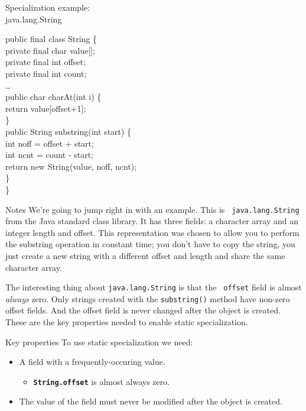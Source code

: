 \documentclass[%
pdf,
colorBG,
slideColor,
nototal,
oqe
]{prosper}
\newenvironment{talknotes}{\begin{slide}{Notes}\tiny}{\end{slide}}
\begin{document}
\begin{slide}{Specialization example:\\\small java.lang.String}
\fontsize{9}{9}%
\bfseries\begin{samplecode}%
public final class String \{\\
\>private final char value[];\\
\>private final int offset;\\
\>private final int count;\\
\>\ldots\\
\>public char charAt(int i) \{\\
\>\>return value[offset+1];\\
\>\}\\
\>public String substring(int start) \{\\
\>\>int noff = offset + start;\\
\>\>int ncnt = count - start;\\
\>\>return new String(value, noff, ncnt);\\
\>\}\\
\}\\
\end{samplecode}
\end{slide}

\begin{talknotes}
We're going to jump right in with an example.  This is {\tt
  java.lang.String} from the Java standard class library.  It has
three fields: a character array and an integer length and offset.
This representation was chosen to allow you to perform the substring
operation in constant time; you don't have to copy the string, you
just create a new string with a different offset and length and
share the same character array.

The interesting thing about {\tt java.lang.String} is that the {\tt
  offset} field is almost \emph{always} zero.  Only strings created
with the {\tt substring()} method have non-zero offset fields. 
And the offset field is never changed after the object is created.
These are the key properties needed to enable static specialization.
\end{talknotes}

\begin{slide}{Key properties}
To use static specialization we need:
\begin{itemize}
 \item A field with a frequently-occuring value.
  \begin{itemize}\small
   \item {\tt\bfseries String.offset} is almost always zero.
  \end{itemize}
 \item The value of the field must never be modified after the object
       is created.
\end{itemize}
\end{slide}
\end{document}
